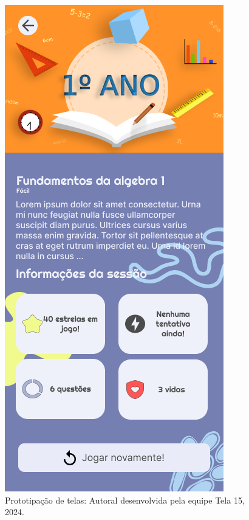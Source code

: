 \documentclass[12pt, openany, oneside, a4paper, english, brazil]{abntex2}   %
\begin{document}
\begin{figure}
    \centering
    \includegraphics[scale=0.7]{figuras/Math.Pow App/Seassion_Page_V3.png}
    \caption{Prototipação de telas: Autoral desenvolvida pela equipe Tela 15, 2024.}
    \label{fig:nome-da-imagem}
\end{figure}
\end{document}
